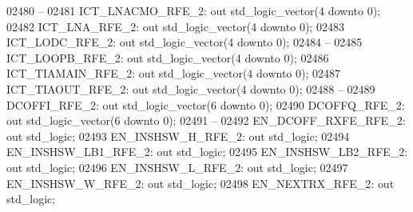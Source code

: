 \begin{DoxyCode}
02480 \textcolor{keyword}{    --}
02481     ICT\_LNACMO\_RFE\_2:   \textcolor{keywordflow}{out} \textcolor{comment}{std\_logic\_vector}(\textcolor{vhdllogic}{}\textcolor{vhdllogic}{4} \textcolor{keywordflow}{downto} \textcolor{vhdllogic}{}\textcolor{vhdllogic}{0});
02482     ICT\_LNA\_RFE\_2:  \textcolor{keywordflow}{out} \textcolor{comment}{std\_logic\_vector}(\textcolor{vhdllogic}{}\textcolor{vhdllogic}{4} \textcolor{keywordflow}{downto} \textcolor{vhdllogic}{}\textcolor{vhdllogic}{0});
02483     ICT\_LODC\_RFE\_2: \textcolor{keywordflow}{out} \textcolor{comment}{std\_logic\_vector}(\textcolor{vhdllogic}{}\textcolor{vhdllogic}{4} \textcolor{keywordflow}{downto} \textcolor{vhdllogic}{}\textcolor{vhdllogic}{0});
02484 \textcolor{keyword}{    --}
02485     ICT\_LOOPB\_RFE\_2:    \textcolor{keywordflow}{out} \textcolor{comment}{std\_logic\_vector}(\textcolor{vhdllogic}{}\textcolor{vhdllogic}{4} \textcolor{keywordflow}{downto} \textcolor{vhdllogic}{}\textcolor{vhdllogic}{0});
02486     ICT\_TIAMAIN\_RFE\_2:  \textcolor{keywordflow}{out} \textcolor{comment}{std\_logic\_vector}(\textcolor{vhdllogic}{}\textcolor{vhdllogic}{4} \textcolor{keywordflow}{downto} \textcolor{vhdllogic}{}\textcolor{vhdllogic}{0});
02487     ICT\_TIAOUT\_RFE\_2:   \textcolor{keywordflow}{out} \textcolor{comment}{std\_logic\_vector}(\textcolor{vhdllogic}{}\textcolor{vhdllogic}{4} \textcolor{keywordflow}{downto} \textcolor{vhdllogic}{}\textcolor{vhdllogic}{0});
02488 \textcolor{keyword}{    --}
02489     DCOFFI\_RFE\_2:   \textcolor{keywordflow}{out} \textcolor{comment}{std\_logic\_vector}(\textcolor{vhdllogic}{}\textcolor{vhdllogic}{6} \textcolor{keywordflow}{downto} \textcolor{vhdllogic}{}\textcolor{vhdllogic}{0});
02490     DCOFFQ\_RFE\_2:   \textcolor{keywordflow}{out} \textcolor{comment}{std\_logic\_vector}(\textcolor{vhdllogic}{}\textcolor{vhdllogic}{6} \textcolor{keywordflow}{downto} \textcolor{vhdllogic}{}\textcolor{vhdllogic}{0});
02491 \textcolor{keyword}{    --}
02492     EN\_DCOFF\_RXFE\_RFE\_2:    \textcolor{keywordflow}{out} \textcolor{comment}{std\_logic};
02493     EN\_INSHSW\_H\_RFE\_2:  \textcolor{keywordflow}{out} \textcolor{comment}{std\_logic};
02494     EN\_INSHSW\_LB1\_RFE\_2:    \textcolor{keywordflow}{out} \textcolor{comment}{std\_logic};
02495     EN\_INSHSW\_LB2\_RFE\_2:    \textcolor{keywordflow}{out} \textcolor{comment}{std\_logic};
02496     EN\_INSHSW\_L\_RFE\_2:  \textcolor{keywordflow}{out} \textcolor{comment}{std\_logic};
02497     EN\_INSHSW\_W\_RFE\_2:  \textcolor{keywordflow}{out} \textcolor{comment}{std\_logic};
02498     EN\_NEXTRX\_RFE\_2:    \textcolor{keywordflow}{out} \textcolor{comment}{std\_logic};

\end{DoxyCode}
